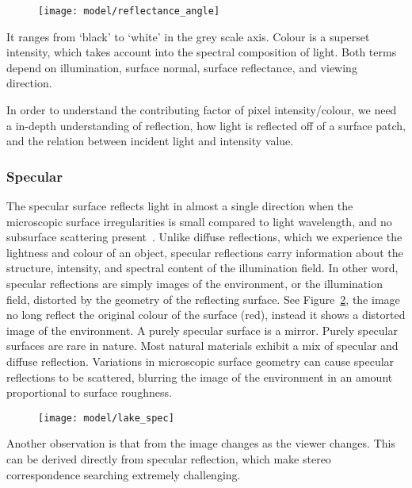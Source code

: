 \begin{figure}[h]
\centering
\texttt{[image: model/reflectance\_angle]}
\label{fig:alb_ang}
\end{figure}

It ranges from `black' to `white' in the grey scale axis. Colour is a superset intensity, which takes account into the spectral composition of light. Both terms depend on illumination, surface normal, surface reflectance, and viewing direction.

In order to understand the contributing factor of pixel intensity/colour, we need a in-depth understanding of reflection, \ie how light is reflected off of a surface patch, and the relation between incident light and intensity value.

\subsubsection{Specular}
The specular surface reflects light in almost a single direction when the microscopic surface irregularities is small compared to light wavelength, and no subsurface scattering present~\cite{nayar1989surface}. Unlike diffuse reflections, which we experience the lightness and colour of an object, specular reflections carry information about the structure, intensity, and spectral content of the illumination field. In other word, specular reflections are simply images of the environment, or the illumination field, distorted by the geometry of the reflecting surface. See Figure~\ref{fig:lake_spec}, the image no long reflect the original colour of the surface (red), instead it shows a distorted image of the environment. A purely specular surface is a mirror. Purely specular surfaces are rare in nature. Most natural materials exhibit a mix of specular and diffuse reflection. Variations in microscopic surface geometry can cause specular reflections to be scattered, blurring the image of the environment in an amount proportional to surface roughness.

\begin{figure}[h]
\centering
\texttt{[image: model/lake\_spec]}
\label{fig:lake_spec}
\end{figure}

Another observation is that from the image changes as the viewer changes. This can be derived directly from specular reflection, which make stereo correspondence searching extremely challenging.

